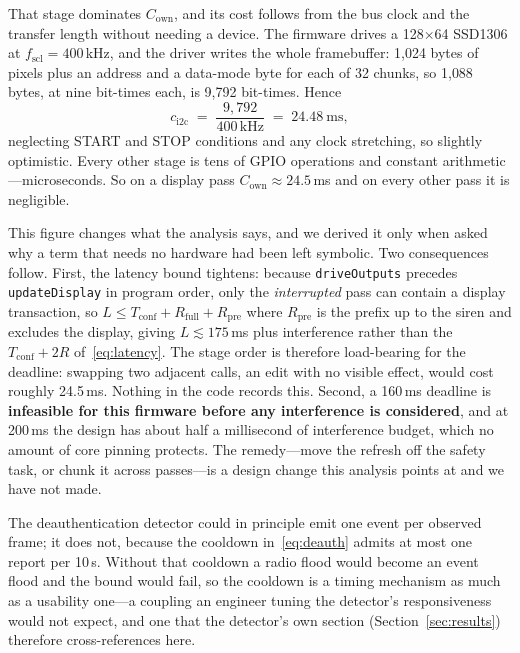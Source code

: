 That stage dominates $C_{\mathrm{own}}$, and its cost follows from the bus clock and the transfer
length without needing a device. The firmware drives a 128$\times$64 SSD1306 at
$f_{\mathrm{scl}} = 400$\,kHz, and the driver writes the whole framebuffer: 1{,}024 bytes of pixels
plus an address and a data-mode byte for each of 32 chunks, so 1{,}088 bytes, at nine bit-times
each, is 9{,}792 bit-times. Hence
\begin{equation}
c_{\mathrm{i2c}} \;=\; \frac{9{,}792}{400\,\mathrm{kHz}} \;=\; 24.48\ \mathrm{ms},
\label{eq:i2c}
\end{equation}
neglecting START and STOP conditions and any clock stretching, so slightly optimistic. Every other
stage is tens of GPIO operations and constant arithmetic---microseconds. So on a display pass
$C_{\mathrm{own}} \approx 24.5$\,ms and on every other pass it is negligible.

This figure changes what the analysis says, and we derived it only when asked why a term that needs
no hardware had been left symbolic. Two consequences follow. First, the latency bound tightens:
because \texttt{driveOutputs} precedes \texttt{updateDisplay} in program order, only the
\emph{interrupted} pass can contain a display transaction, so
$L \le T_{\mathrm{conf}} + R_{\mathrm{full}} + R_{\mathrm{pre}}$ where $R_{\mathrm{pre}}$ is the
prefix up to the siren and excludes the display, giving $L \lesssim 175$\,ms plus interference
rather than the $T_{\mathrm{conf}} + 2R$ of~\eqref{eq:latency}. The stage order is therefore
load-bearing for the deadline: swapping two adjacent calls, an edit with no visible effect, would
cost roughly 24.5\,ms. Nothing in the code records this. Second, a 160\,ms deadline is
\textbf{infeasible for this firmware before any interference is considered}, and at 200\,ms the
design has about half a millisecond of interference budget, which no amount of core pinning
protects. The remedy---move the refresh off the safety task, or chunk it across passes---is a
design change this analysis points at and we have not made.

The deauthentication
detector could in principle emit one event per observed frame; it does not, because the cooldown
in~\eqref{eq:deauth} admits at most one report per 10\,s. Without that cooldown a radio flood
would become an event flood and the bound would fail, so the cooldown is a timing mechanism as
much as a usability one---a coupling an engineer tuning the detector's responsiveness would not
expect, and one that the detector's own section (Section~\ref{sec:results}) therefore
cross-references here.

